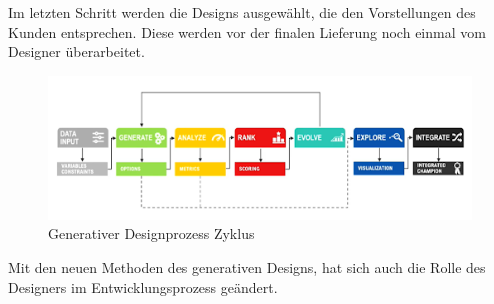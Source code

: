 Im letzten Schritt werden die Designs ausgewählt, die den Vorstellungen des Kunden entsprechen. Diese werden vor der finalen Lieferung noch einmal vom Designer überarbeitet. \autocite{12} \autocite{15} \autocite*{16}


\begin{figure}[h]
  \centering
  \begin{minipage}{0.5\textwidth}
    \centering
    \includegraphics[width=\textwidth]{./images/7stepDesignProzess.png}
  \end{minipage}
  \caption{Generativer Designprozess Zyklus}
  \label{fig:designprozess}
\end{figure}

Mit den neuen Methoden des generativen Designs, hat sich auch die Rolle des Designers im Entwicklungsprozess geändert. \autocite*{16}